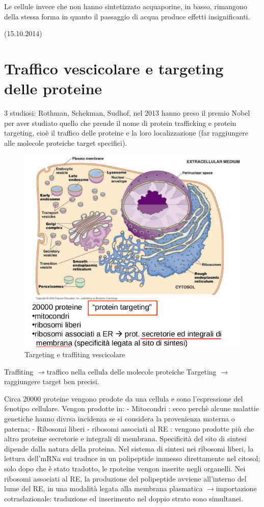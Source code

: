 \documentclass[a4paper,12pt]{article}
\newcommand{\lfreccia}{\ensuremath{\longrightarrow}}
\begin{document}
Le cellule invece che non hanno sintetizzato acquaporine, in basso, rimangono della stessa
forma in quanto il passaggio di acqua produce effetti
insignificanti.

(15.10.2014)

\section{Traffico vescicolare e targeting delle proteine}
3 studiosi: Rothman, Schekman, Sudhof, nel 2013 hanno preso il premio Nobel per aver
studiato quello che prende il nome di protein trafficking e protein targeting, cioè il traffico
delle proteine e la loro localizzazione (far raggiungere alle molecole proteiche target specifici).
\begin{figure}[H]
\centering
\includegraphics[scale=0.3]{immagine/target.jpg}
\caption{Targeting e traffiting vescicolare}
\end{figure}

Traffiting \lfreccia traffico nella cellula delle molecole proteiche
Targeting \lfreccia raggiungere target ben precisi.

Circa 20000 proteine vengono prodote da una cellula e sono l'espressione del fenotipo cellulare. Vengon prodotte in:
- Mitocondri : ecco perchè alcune malattie genetiche hanno divrsa incidenza se si considera la provenienza materna o paterna;
- Ribosomi liberi
- ribosomi associati al RE : vengono prodotte più che altro proteine secretorie e integrali di membrana.
Specificità del sito di sintesi dipende dalla natura della proteina.
Nel sistema di sintesi nei ribosomi liberi, la lettura dell'mRNa sui traduce in un polipeptide immesso direttamente nel citosol; solo dopo che è stato tradotto, le rpoteine vengon inserite negli organelli.
Nei ribosomi associati al RE, la produzione del polipeptide avviene all'interno del lume del RE, in una modalità legata alla membrana plasmatica \lfreccia importazione cotraslazionale: traduzione ed inserimento nel doppio strato sono simultanei.
\end{document}
